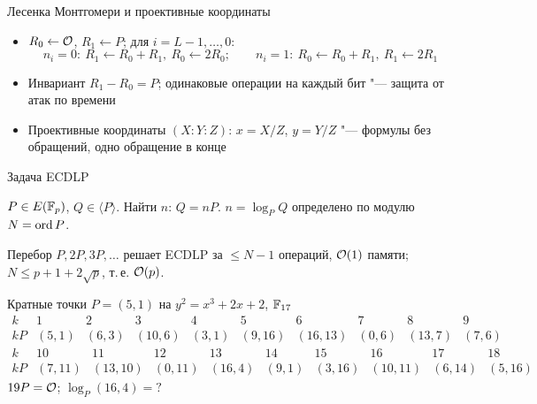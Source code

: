 \documentclass{ca-slides}
\begin{document}
\begin{canvasframe}{Лесенка Монтгомери и проективные координаты}
  \begin{itemize}
    \item $R_0 \gets \mathcal{O}$, $R_1 \gets P$; для $i = L - 1, \dots, 0$:
      \[
        n_i = 0:\ R_1 \gets R_0 + R_1,\ R_0 \gets 2R_0; \qquad
        n_i = 1:\ R_0 \gets R_0 + R_1,\ R_1 \gets 2R_1
      \]
    \item Инвариант $R_1 - R_0 = P$; одинаковые операции на каждый бит "--- защита от атак
      по времени
    \item Проективные координаты $(X : Y : Z)$: $x = X/Z$, $y = Y/Z$ "--- формулы без
      обращений, одно обращение в конце
  \end{itemize}
\end{canvasframe}

\begin{canvasframe}{Задача ECDLP}
  \begin{definition}
    $P \in E(\mathbb{F}_p)$, $Q \in \langle P \rangle$. Найти $n$: $Q = nP$.
    \quad $n = \log_P Q$ определено по модулю $N = \operatorname{ord} P$.
  \end{definition}
  \begin{proposition}
    Перебор $P, 2P, 3P, \dots$ решает ECDLP за $\le N - 1$ операций, $\mathcal{O}(1)$ памяти;
    $N \le p + 1 + 2\sqrt p$, т.\,е. $\mathcal{O}(p)$.
  \end{proposition}
\end{canvasframe}

\begin{canvasframe}{Кратные точки $P = (5, 1)$ на $y^2 = x^3 + 2x + 2$, $\mathbb{F}_{17}$}
  \footnotesize
  \[
  \begin{array}{c|ccccccccc}
    k  & 1 & 2 & 3 & 4 & 5 & 6 & 7 & 8 & 9 \\ \hline
    kP & (5,1) & (6,3) & (10,6) & (3,1) & (9,16) & (16,13) & (0,6) & (13,7) & (7,6)
  \end{array}
  \]
  \[
  \begin{array}{c|ccccccccc}
    k  & 10 & 11 & 12 & 13 & 14 & 15 & 16 & 17 & 18 \\ \hline
    kP & (7,11) & (13,10) & (0,11) & (16,4) & (9,1) & (3,16) & (10,11) & (6,14) & (5,16)
  \end{array}
  \]
  \normalsize
  $19P = \mathcal{O}$; \quad $\log_P (16, 4) = ?$
\end{canvasframe}
\end{document}
